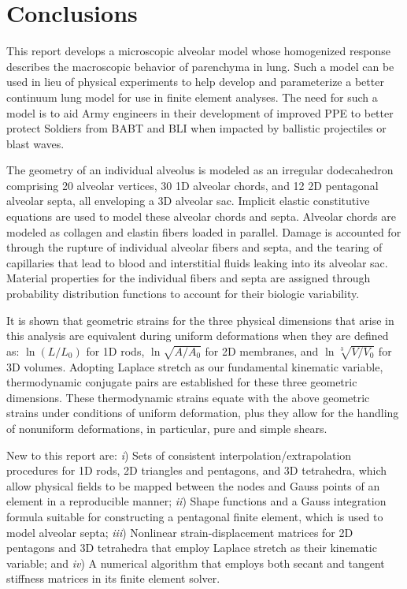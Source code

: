 \section{Conclusions}
\label{partConclusions}

This report develops a micro\-scopic alveolar model whose homogenized response describes the macro\-scopic behavior of parenchyma in lung.  Such a model can be used in lieu of physical experiments to help develop and parameterize a better continuum lung model for use in finite element analyses.   The need for such a model is to aid Army engineers in their development of improved PPE to better protect Soldiers from BABT and BLI when impacted by ballistic projectiles or blast waves.  

The geometry of an individual alveolus is modeled as an irregular dodecahedron comprising 20 alveolar vertices, 30 1D alveolar chords, and 12 2D pentagonal alveolar septa, all enveloping a 3D alveolar sac.  Implicit elastic constitutive equations are used to model these alveolar chords and septa.  Alveolar chords are modeled as collagen and elastin fibers loaded in parallel.  Damage is accounted for through the rupture of individual alveolar fibers and septa, and the tearing of capillaries that lead to blood and interstitial fluids leaking into its alveolar sac.  Material properties for the individual fibers and septa are assigned through probability distribution functions to account for their biologic variability.

It is shown that geometric strains for the three physical dimensions that arise in this analysis are equivalent during uniform deformations when they are defined as: $\ln (L / L_0)$ for 1D rods, $\ln \sqrt{A / \! A_0}$ for 2D membranes, and $\ln \sqrt[3]{V \! / V_0}$ for 3D volumes.  Adopting Laplace stretch as our fundamental kinematic variable, thermo\-dynamic conjugate pairs are established for these three geometric dimensions.  These thermo\-dynamic strains equate with the above geometric strains under conditions of uniform deformation, plus they allow for the handling of nonuniform deformations, in particular, pure and simple shears.

New to this report are:  \textit{i\/}) Sets of consistent interpolation\slash extrapolation procedures for 1D rods, 2D triangles and pentagons, and 3D tetrahedra, which allow physical fields to be mapped between the nodes and Gauss points of an element in a reproducible manner; \textit{ii\/}) Shape functions and a Gauss integration formula suitable for constructing a pentagonal finite element, which is used to model alveolar septa; \textit{iii\/}) Nonlinear strain-displacement matrices for 2D pentagons and 3D tetrahedra that employ Laplace stretch as their kinematic variable; and \textit{iv\/})  A numerical algorithm that employs both secant and tangent stiffness matrices in its finite element solver.
